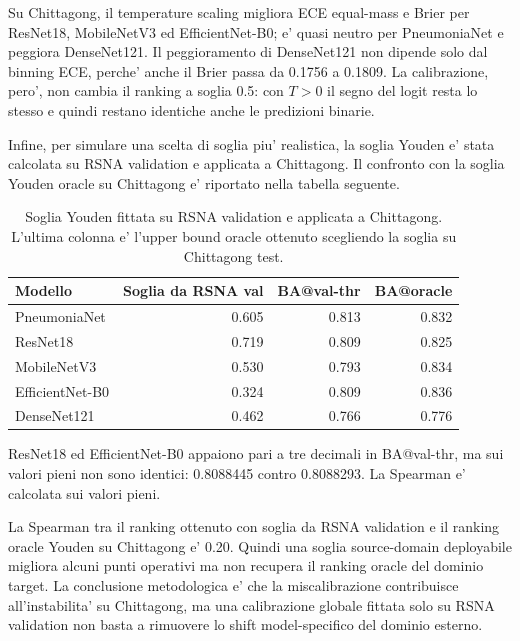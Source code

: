 \documentclass[11pt,a4paper]{article}
\begin{document}
Su Chittagong, il temperature scaling migliora ECE equal-mass e Brier per
ResNet18, MobileNetV3 ed EfficientNet-B0; e' quasi neutro per PneumoniaNet e
peggiora DenseNet121. Il peggioramento di DenseNet121 non dipende solo dal
binning ECE, perche' anche il Brier passa da 0.1756 a 0.1809. La calibrazione,
pero', non cambia il ranking a soglia 0.5: con \(T>0\) il segno del logit resta
lo stesso e quindi restano identiche anche le predizioni binarie.

Infine, per simulare una scelta di soglia piu' realistica, la soglia Youden e'
stata calcolata su RSNA validation e applicata a Chittagong. Il confronto con
la soglia Youden oracle su Chittagong e' riportato nella tabella seguente.

\begin{table}[H]
\centering
\caption{Soglia Youden fittata su RSNA validation e applicata a Chittagong. L'ultima colonna e' l'upper bound oracle ottenuto scegliendo la soglia su Chittagong test.}
\label{tab:validation-threshold}
\begin{tabular}{lrrr}
\toprule
Modello & Soglia da RSNA val & BA@val-thr & BA@oracle \\
\midrule
PneumoniaNet & 0.605 & 0.813 & 0.832 \\
ResNet18 & 0.719 & 0.809 & 0.825 \\
MobileNetV3 & 0.530 & 0.793 & 0.834 \\
EfficientNet-B0 & 0.324 & 0.809 & 0.836 \\
DenseNet121 & 0.462 & 0.766 & 0.776 \\
\bottomrule
\end{tabular}
\vspace{0.2em}

\footnotesize{ResNet18 ed EfficientNet-B0 appaiono pari a tre decimali in BA@val-thr, ma sui valori pieni non sono identici: 0.8088445 contro 0.8088293. La Spearman e' calcolata sui valori pieni.}
\end{table}

La Spearman tra il ranking ottenuto con soglia da RSNA validation e il ranking
oracle Youden su Chittagong e' 0.20. Quindi una soglia source-domain
deployabile migliora alcuni punti operativi ma non recupera il ranking oracle
del dominio target. La conclusione metodologica e' che la miscalibrazione
contribuisce all'instabilita' su Chittagong, ma una calibrazione globale fittata
solo su RSNA validation non basta a rimuovere lo shift model-specifico del
dominio esterno.
\end{document}

